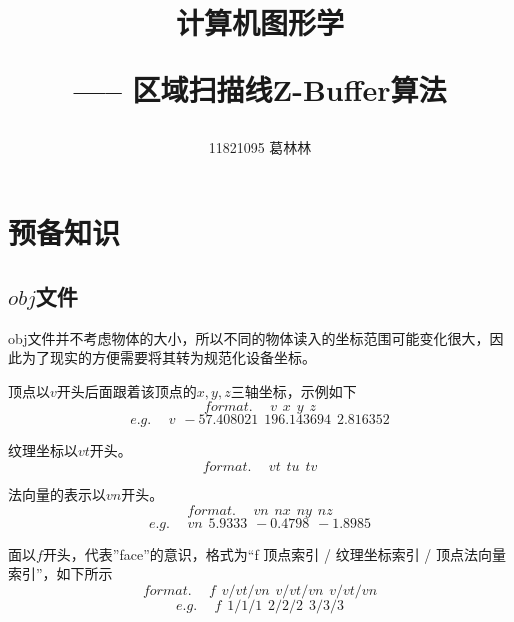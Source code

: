 \documentclass[10pt]{article}
\title{计算机图形学 \hspace{2pt}\hspace{2pt} \begin{large}----- \hspace{2pt} 区域扫描线Z-Buffer算法 \end{large} }
\author{11821095 葛林林}
\begin{document}
\maketitle


\section{预备知识}
\subsection{$obj$文件}
obj文件并不考虑物体的大小，所以不同的物体读入的坐标范围可能变化很大，因此为了现实的方便需要将其转为规范化设备坐标。

顶点以$v$开头后面跟着该顶点的$x,y,z$三轴坐标，示例如下
$$format. \hspace{15pt} v\hspace{5pt} x\hspace{5pt}y\hspace{5pt}z$$
$$e.g. \hspace{15pt} v\hspace{5pt} -57.408021\hspace{5pt}196.143694\hspace{5pt}2.816352$$

纹理坐标以$vt$开头。
$$format.\hspace{15pt} vt \hspace{5pt}tu \hspace{5pt} tv$$
$$$$

法向量的表示以$vn$开头。
$$format.\hspace{15pt} vn \hspace{5pt} nx \hspace{5pt} ny \hspace{5pt} nz$$
$$e.g. \hspace{15pt} vn \hspace{5pt} 5.9333 \hspace{5pt} -0.4798 \hspace{5pt} -1.8985$$

面以$f$开头，代表”face”的意识，格式为“f 顶点索引 / 纹理坐标索引 / 顶点法向量索引”，如下所示
$$format.\hspace{15pt} f \hspace{5pt} v/vt/vn \hspace{5pt} v/vt/vn \hspace{5pt} v/vt/vn$$
$$e.g.\hspace{15pt} f \hspace{5pt} 1/1/1 \hspace{5pt} 2/2/2 \hspace{5pt} 3/3/3$$
\end{document}

